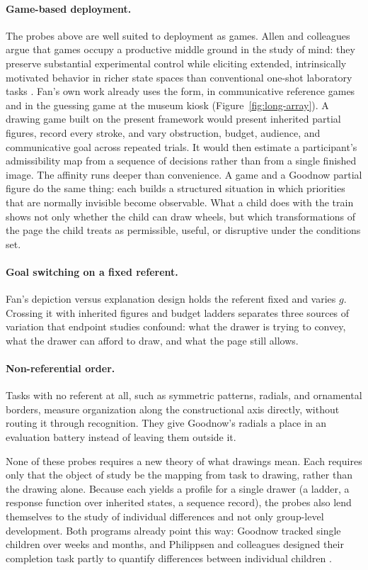 \documentclass[11pt]{article}
\theoremstyle{remark}
\begin{document}
\paragraph{Game-based deployment.} The probes above are well suited to deployment as games. Allen and colleagues argue that games occupy a productive middle ground in the study of mind: they preserve substantial experimental control while eliciting extended, intrinsically motivated behavior in richer state spaces than conventional one-shot laboratory tasks \cite{allen2024games}. Fan's own work already uses the form, in communicative reference games and in the guessing game at the museum kiosk (Figure~\ref{fig:long-array}). A drawing game built on the present framework would present inherited partial figures, record every stroke, and vary obstruction, budget, audience, and communicative goal across repeated trials. It would then estimate a participant's admissibility map from a sequence of decisions rather than from a single finished image. The affinity runs deeper than convenience. A game and a Goodnow partial figure do the same thing: each builds a structured situation in which priorities that are normally invisible become observable. What a child does with the train shows not only whether the child can draw wheels, but which transformations of the page the child treats as permissible, useful, or disruptive under the conditions set.

\paragraph{Goal switching on a fixed referent.} Fan's depiction versus explanation design holds the referent fixed and varies $g$. Crossing it with inherited figures and budget ladders separates three sources of variation that endpoint studies confound: what the drawer is trying to convey, what the drawer can afford to draw, and what the page still allows.

\paragraph{Non-referential order.} Tasks with no referent at all, such as symmetric patterns, radials, and ornamental borders, measure organization along the constructional axis directly, without routing it through recognition. They give Goodnow's radials a place in an evaluation battery instead of leaving them outside it.

None of these probes requires a new theory of what drawings mean. Each requires only that the object of study be the mapping from task to drawing, rather than the drawing alone. Because each yields a profile for a single drawer (a ladder, a response function over inherited states, a sequence record), the probes also lend themselves to the study of individual differences and not only group-level development. Both programs already point this way: Goodnow tracked single children over weeks and months, and Philippsen and colleagues designed their completion task partly to quantify differences between individual children \cite{philippsen2022}.
\end{document}
